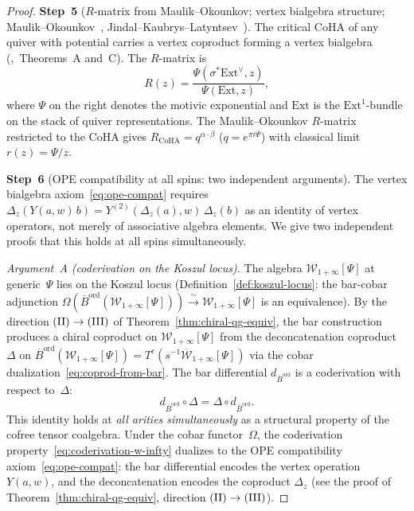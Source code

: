 \documentclass[11pt,reqno]{amsart}
\theoremstyle{definition}
\theoremstyle{remark}
\newcommand{\cW}{\mathcal{W}}
\newcommand{\Barord}{\overline{B}^{\mathrm{ord}}}
\numberwithin{equation}{section}
\begin{document}
\begin{proof}
\medskip
\noindent
\textbf{Step~5}
($R$-matrix from Maulik--Okounkov; vertex bialgebra
structure; Maulik--Okounkov~\cite{MO19},
Jindal--Kaubrys--Latyntsev~\cite{JKL26}).
The critical CoHA of any quiver with potential carries
a vertex coproduct forming a vertex
bialgebra (\cite{JKL26},~Theorems~A and~C). The
$R$-matrix is
\[
  R(z)
  = \frac{\Psi(\sigma^* \mathrm{Ext}^\vee, z)}
  {\Psi(\mathrm{Ext}, z)},
\]
where $\Psi$ on the right denotes the motivic exponential
and $\mathrm{Ext}$ is the $\mathrm{Ext}^1$-bundle on the
stack of quiver representations.
The Maulik--Okounkov $R$-matrix~\cite{MO19}
restricted to the CoHA gives
$R_{\mathrm{CoHA}} = q^{\alpha \cdot \beta}$
($q = e^{\pi i \Psi}$) with classical limit
$r(z) = \Psi/z$.

\medskip
\noindent
\textbf{Step~6}
(OPE compatibility at all spins: two independent
arguments).
The vertex bialgebra axiom~\eqref{eq:ope-compat}
requires $\Delta_z(Y(a,w)\,b)
= Y^{(2)}(\Delta_z(a),w)\,\Delta_z(b)$
as an identity of vertex operators, not merely of
associative algebra elements. We give two independent
proofs that this holds at all spins simultaneously.

\smallskip
\noindent\emph{Argument~A \textup{(}coderivation on the
Koszul locus\textup{)}.}
The algebra $\cW_{1+\infty}[\Psi]$ at generic~$\Psi$ lies
on the Koszul locus
\textup{(}Definition~\textup{\ref{def:koszul-locus}}:
the bar-cobar adjunction
$\Omega(\Barord(\cW_{1+\infty}[\Psi]))
\xrightarrow{\;\sim\;} \cW_{1+\infty}[\Psi]$ is an
equivalence\textup{)}. By the direction
$\textup{(II)} \to \textup{(III)}$ of
Theorem~\textup{\ref{thm:chiral-qg-equiv}}, the bar
construction produces a chiral coproduct on
$\cW_{1+\infty}[\Psi]$ from the deconcatenation coproduct
$\Delta$ on $\Barord(\cW_{1+\infty}[\Psi])
= T^c(s^{-1}\overline{\cW}_{1+\infty}[\Psi])$
via the cobar dualization~\eqref{eq:coprod-from-bar}.
The bar differential $d_{\Barord}$ is a coderivation with
respect to~$\Delta$:
\begin{equation}\label{eq:coderivation-w-infty}
  d_{\Barord} \circ \Delta
  = \Delta \circ d_{\Barord}.
\end{equation}
This identity holds at \emph{all arities
simultaneously} as a structural property of the cofree
tensor coalgebra. Under the cobar functor~$\Omega$, the
coderivation property~\eqref{eq:coderivation-w-infty}
dualizes to the OPE compatibility
axiom~\eqref{eq:ope-compat}: the bar differential
encodes the vertex operation $Y(a,w)$, and the
deconcatenation encodes the coproduct $\Delta_z$
\textup{(}see the proof of
Theorem~\textup{\ref{thm:chiral-qg-equiv}}, direction
$\textup{(II)} \to \textup{(III)}$\textup{)}.


\end{proof}
\end{document}

